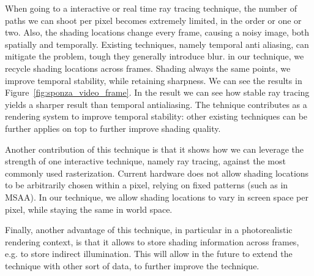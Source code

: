 When going to a interactive or real time ray tracing technique, the number of paths we can shoot per pixel becomes extremely limited, in the order or one or two. Also, the shading locations change every frame, causing a noisy image, both spatially and temporally. Existing techniques, namely temporal anti aliasing, can mitigate the problem, tough they generally introduce blur. in our technique, we recycle shading locations across frames. Shading always the same points, we improve temporal stability, while retaining sharpness. We can see the results in Figure~\ref{fig:sponza_video_frame}. In the result we can see how stable ray tracing yields a  sharper result than temporal antialiasing. The tehnique contributes as a rendering system to improve temporal stability: other existing techniques can be further applies on top to further improve shading quality. 

Another contribution of this technique is that it shows how we can leverage the strength of one interactive technique, namely ray tracing, against the most commonly used rasterization. Current hardware does not allow shading locations to be arbitrarily chosen within a pixel, relying on fixed patterns (such as in MSAA). In our technique, we allow shading locations to vary in screen space per pixel, while staying the same in world space. 

Finally, another advantage of this technique, in particular in a photorealistic rendering context, is that it allows to store shading information across frames, e.g. to store indirect illumination. This will allow in the future to extend the technique with other sort of data, to further improve the technique. 
%

